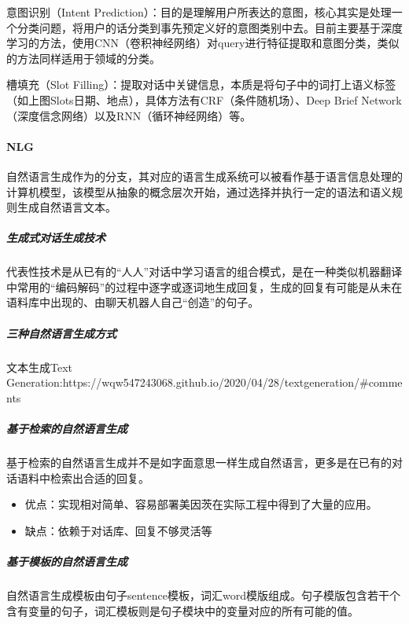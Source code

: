 \documentclass[letterpaper,10pt,english]{sphinxmanual}
\begin{document}
意图识别（Intent
Prediction）：目的是理解用户所表达的意图，核心其实是处理一个分类问题，将用户的话分类到事先预定义好的意图类别中去。目前主要基于深度学习的方法，使用CNN（卷积神经网络）对query进行特征提取和意图分类，类似的方法同样适用于领域的分类。

槽填充（Slot
Filling）：提取对话中关键信息，本质是将句子中的词打上语义标签（如上图Slots日期、地点），具体方法有CRF（条件随机场）、Deep
Brief
Network（深度信念网络）以及RNN（循环神经网络）等。%
\begin{footnote}[954]\sphinxAtStartFootnote
{}
%
\end{footnote}


\paragraph{NLG}
\label{\detokenize{chapter_AI_dive/NLP:nlg}}
自然语言生成作为的分支，其对应的语言生成系统可以被看作基于语言信息处理的计算机模型，该模型从抽象的概念层次开始，通过选择并执行一定的语法和语义规则生成自然语言文本。


\subparagraph{生成式对话生成技术}
\label{\detokenize{chapter_AI_dive/NLP:id5}}
代表性技术是从已有的“人\sphinxhyphen{}人”对话中学习语言的组合模式，是在一种类似机器翻译中常用的“编码\sphinxhyphen{}解码”的过程中逐字或逐词地生成回复，生成的回复有可能是从未在语料库中出现的、由聊天机器人自己“创造”的句子。


\subparagraph{三种自然语言生成方式}
\label{\detokenize{chapter_AI_dive/NLP:id6}}
文本生成\sphinxhyphen{}Text
Generation:https://wqw547243068.github.io/2020/04/28/text\sphinxhyphen{}generation/\#comments


\subparagraph{基于检索的自然语言生成}
\label{\detokenize{chapter_AI_dive/NLP:id7}}
基于检索的自然语言生成并不是如字面意思一样生成自然语言，更多是在已有的对话语料中检索出合适的回复。
\begin{itemize}
\item {} 
优点：实现相对简单、容易部署美因茨在实际工程中得到了大量的应用。

\item {} 
缺点：依赖于对话库、回复不够灵活等

\end{itemize}


\subparagraph{基于模板的自然语言生成}
\label{\detokenize{chapter_AI_dive/NLP:id8}}
自然语言生成模板由句子sentence模板，词汇word模版组成。句子模版包含若干个含有变量的句子，词汇模板则是句子模块中的变量对应的所有可能的值。
\end{document}
